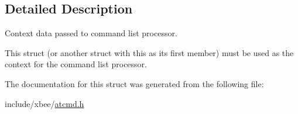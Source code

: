 \subsection{Detailed Description}
Context data passed to command list processor. 

This struct (or another struct with this as its first member) must be used as the context for the command list processor. 

The documentation for this struct was generated from the following file\+:\begin{DoxyCompactItemize}
\item 
include/xbee/\hyperlink{atcmd_8h}{atcmd.\+h}\end{DoxyCompactItemize}
